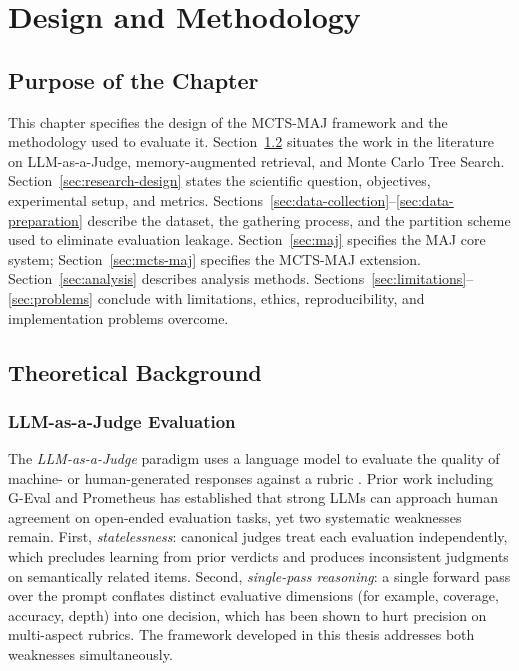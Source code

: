 \documentclass[12pt,a4paper]{report}
\begin{document}
\tableofcontents

\chapter{Design and Methodology}

\section{Purpose of the Chapter}

This chapter specifies the design of the MCTS-MAJ framework and the methodology used to evaluate it. Section~\ref{sec:background} situates the work in the literature on LLM-as-a-Judge, memory-augmented retrieval, and Monte Carlo Tree Search. Section~\ref{sec:research-design} states the scientific question, objectives, experimental setup, and metrics. Sections~\ref{sec:data-collection}--\ref{sec:data-preparation} describe the dataset, the gathering process, and the partition scheme used to eliminate evaluation leakage. Section~\ref{sec:maj} specifies the MAJ core system; Section~\ref{sec:mcts-maj} specifies the MCTS-MAJ extension. Section~\ref{sec:analysis} describes analysis methods. Sections~\ref{sec:limitations}--\ref{sec:problems} conclude with limitations, ethics, reproducibility, and implementation problems overcome.

\section{Theoretical Background}
\label{sec:background}

\subsection{LLM-as-a-Judge Evaluation}

The \textit{LLM-as-a-Judge} paradigm uses a language model to evaluate the quality of machine- or human-generated responses against a rubric \cite{geval2023, mt_bench2023}. Prior work including G-Eval \cite{geval2023} and Prometheus \cite{prometheus2023} has established that strong LLMs can approach human agreement on open-ended evaluation tasks, yet two systematic weaknesses remain. First, \textit{statelessness}: canonical judges treat each evaluation independently, which precludes learning from prior verdicts and produces inconsistent judgments on semantically related items. Second, \textit{single-pass reasoning}: a single forward pass over the prompt conflates distinct evaluative dimensions (for example, coverage, accuracy, depth) into one decision, which has been shown to hurt precision on multi-aspect rubrics. The framework developed in this thesis addresses both weaknesses simultaneously.
\end{document}
